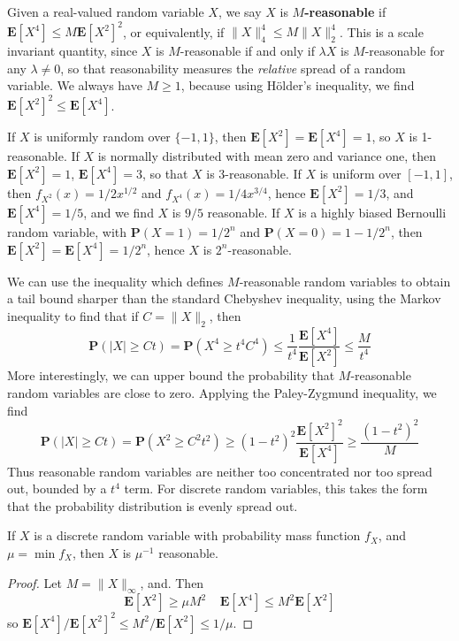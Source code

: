 Given a real-valued random variable $X$, we say $X$ is {\bf $M$-reasonable} if $\mathbf{E}[X^4] \leq M \mathbf{E}[X^2]^2$, or equivalently, if $\| X \|_4^4 \leq M \| X \|_2^4$. This is a scale invariant quantity, since $X$ is $M$-reasonable if and only if $\lambda X$ is $M$-reasonable for any $\lambda \neq 0$, so that reasonability measures the {\it relative} spread of a random variable. We always have $M \geq 1$, because using H\"{o}lder's inequality, we find $\mathbf{E}[X^2]^2 \leq \mathbf{E}[X^4]$.

\begin{example}
    If $X$ is uniformly random over $\{ -1, 1 \}$, then $\mathbf{E}[X^2] = \mathbf{E}[X^4] = 1$, so $X$ is 1-reasonable. If $X$ is normally distributed with mean zero and variance one, then $\mathbf{E}[X^2] = 1$, $\mathbf{E}[X^4] = 3$, so that $X$ is 3-reasonable. If $X$ is uniform over $[-1,1]$, then $f_{X^2}(x) = 1/2x^{1/2}$ and $f_{X^4}(x) = 1/4x^{3/4}$, hence $\mathbf{E}[X^2] = 1/3$, and $\mathbf{E}[X^4] = 1/5$, and we find $X$ is $9/5$ reasonable. If $X$ is a highly biased Bernoulli random variable, with $\mathbf{P}(X = 1) = 1/2^n$ and $\mathbf{P}(X = 0) = 1 - 1/2^n$, then $\mathbf{E}[X^2] = \mathbf{E}[X^4] = 1/2^n$, hence $X$ is $2^n$-reasonable.
\end{example}

We can use the inequality which defines $M$-reasonable random variables to obtain a tail bound sharper than the standard Chebyshev inequality, using the Markov inequality to find that if $C = \| X \|_2$, then
%
\[ \mathbf{P}(|X| \geq Ct) = \mathbf{P}(X^4 \geq t^4 C^4) \leq \frac{1}{t^4} \frac{\mathbf{E}[X^4]}{\mathbf{E}[X^2]} \leq \frac{M}{t^4} \]
%
More interestingly, we can upper bound the probability that $M$-reasonable random variables are close to zero. Applying the Paley-Zygmund inequality, we find
%
\[ \mathbf{P}(|X| \geq Ct) = \mathbf{P}(X^2 \geq C^2t^2) \geq (1 - t^2)^2 \frac{\mathbf{E}[X^2]^2}{\mathbf{E}[X^4]} \geq \frac{(1 - t^2)^2}{M} \]
%
Thus reasonable random variables are neither too concentrated nor too spread out, bounded by a $t^4$ term. For discrete random variables, this takes the form that the probability distribution is evenly spread out.

\begin{theorem}
    If $X$ is a discrete random variable with probability mass function $f_X$, and $\mu = \min f_X$, then $X$ is $\mu^{-1}$ reasonable.
\end{theorem}
\begin{proof}
    Let $M = \| X \|_\infty$, and. Then
    \[ \mathbf{E}[X^2] \geq \mu M^2 \ \ \ \ \ \mathbf{E}[X^4] \leq M^2 \mathbf{E}[X^2] \]
    so $\mathbf{E}[X^4]/\mathbf{E}[X^2]^2 \leq M^2/\mathbf{E}[X^2] \leq 1/\mu$.
\end{proof}

